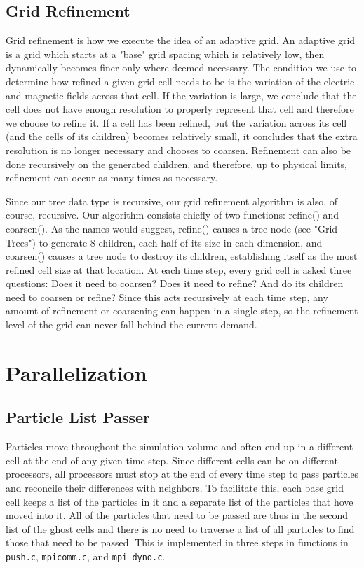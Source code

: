 \documentclass[]{article}
\begin{document}
\subsection{Grid Refinement}
Grid refinement is how we execute the idea of an adaptive grid. An adaptive grid is a grid which starts at a "base" grid spacing which is relatively low, then dynamically becomes finer only where deemed necessary. The condition we use to determine how refined a given grid cell needs to be is the variation of the electric and magnetic fields across that cell. If the variation is large, we conclude that the cell does not have enough resolution to properly represent that cell and therefore we choose to refine it. If a cell has been refined, but the variation across its cell (and the cells of its children) becomes relatively small, it concludes that the extra resolution is no longer necessary and chooses to coarsen. Refinement can also be done recursively on the generated children, and therefore, up to physical limits, refinement can occur as many times as necessary.

Since our tree data type is recursive, our grid refinement algorithm is also, of course, recursive. Our algorithm consists chiefly of two functions: refine() and coarsen(). As the names would suggest, refine() causes a tree node (see "Grid Trees") to generate 8 children, each half of its size in each dimension, and coarsen() causes a tree node to destroy its children, establishing itself as the most refined cell size at that location. At each time step, every grid cell is asked three questions: Does it need to coarsen? Does it need to refine? And do its children need to coarsen or refine? Since this acts recursively at each time step, any amount of refinement or coarsening can happen in a single step, so the refinement level of the grid can never fall behind the current demand.


\section{Parallelization}

\subsection{Particle List Passer}
Particles move throughout the simulation volume and often end up in a different cell at the end of any given time step.  Since different cells can be on different processors, all processors must stop at the end of every time step to pass particles and reconcile their differences with neighbors.  To facilitate this, each base grid cell keeps a list of the particles in it and a separate list of the particles that hove moved into it.  All of the particles that need to be passed are thus in the second list of the ghost cells and there is no need to traverse a list of all particles to find those that need to be passed.  This is implemented in three steps in functions in \texttt{push.c}, \texttt{mpicomm.c}, and \texttt{mpi\_dyno.c}.
\end{document}
